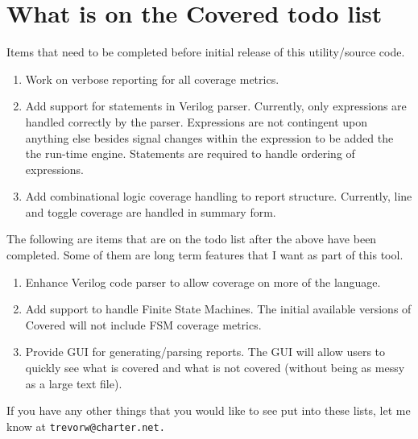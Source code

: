 \section{What is on the Covered todo list}\label{page_todo}


 Items that need to be completed before initial release of this utility/source code.

\begin{enumerate}
\item 
Work on verbose reporting for all coverage metrics.\item 
Add support for statements in Verilog parser. Currently, only expressions are handled correctly by the parser. Expressions are not contingent upon anything else besides signal changes within the expression to be added the the run-time engine. Statements are required to handle ordering of expressions.\item 
Add combinational logic coverage handling to report structure. Currently, line and toggle coverage are handled in summary form.\end{enumerate}


 The following are items that are on the todo list after the above have been completed. Some of them are long term features that I want as part of this tool.

\begin{enumerate}
\item 
Enhance Verilog code parser to allow coverage on more of the language.\item 
Add support to handle Finite State Machines. The initial available versions of Covered will not include FSM coverage metrics.\item 
Provide GUI for generating/parsing reports. The GUI will allow users to quickly see what is covered and what is not covered (without being as messy as a large text file).\end{enumerate}


 If you have any other things that you would like to see put into these lists, let me know at {\tt trevorw@charter.net.}

